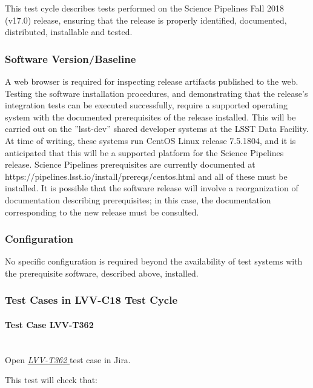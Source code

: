 \documentclass[DM,lsstdraft,STR,toc]{lsstdoc}
\begin{document}
  This test cycle describes tests performed on the Science Pipelines Fall
2018 (v17.0) release, ensuring that the release is properly identified,
documented, distributed, installable and tested.


  \subsubsection{Software Version/Baseline}
    A web browser is required for inspecting release artifacts published to
the web.\\[2\baselineskip]Testing the software installation procedures,
and demonstrating that the release's integration tests can be executed
successfully, require a supported operating system with the documented
prerequisites of the release installed. This will be carried out on the
''lsst-dev'' shared developer systems at the LSST Data Facility. At time
of writing, these systems run CentOS Linux release 7.5.1804, and it is
anticipated that this will be a supported platform for the Science
Pipelines release. Science Pipelines prerequisites are currently
documented at https://pipelines.lsst.io/install/prereqs/centos.html and
all of these must be installed. It is possible that the software release
will involve a reorganization of documentation describing prerequisites;
in this case, the documentation corresponding to the new release must be
consulted.


  \subsubsection{Configuration}
    No specific configuration is required beyond the availability of test
systems with the prerequisite software, described above, installed.


  \subsubsection{Test Cases in LVV-C18 Test Cycle}


    \paragraph{Test Case LVV-T362 }\mbox{}\\

Open  \href{https://jira.lsstcorp.org/secure/Tests.jspa#/testCase/LVV-T362}{\textit{ LVV-T362 } }
test case in Jira.

    This test will check that:
\end{document}
